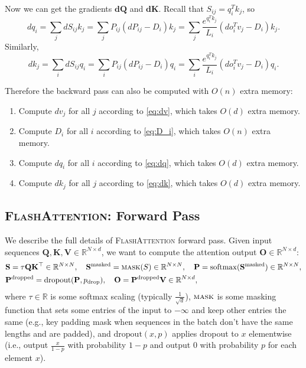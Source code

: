 \documentclass{article}
\newcommand{\softmax}{\mathrm{softmax}}
\newcommand{\vQ}{\mathbf{Q}}
\newcommand{\vK}{\mathbf{K}}
\newcommand{\vV}{\mathbf{V}}
\newcommand{\vdQ}{\mathbf{dQ}}
\newcommand{\vdK}{\mathbf{dK}}
\newcommand{\vS}{\mathbf{S}}
\newcommand{\vP}{\mathbf{P}}
\newcommand{\vO}{\mathbf{O}}
\newcommand{\sysname}{\textsc{FlashAttention}\xspace}
\begin{document}
Now we can get the gradients $\vdQ$ and $\vdK$.
Recall that $S_{ij} = q_i^T k_j$, so
\begin{equation}
  \label{eq:dq}
  dq_i = \sum_{j} dS_{ij} k_j = \sum_{j} P_{ij} (dP_{ij} - D_i) k_j = \sum_{j} \frac{e^{q_i^T k_j}}{L_i} (do_i^T v_j - D_i) k_j.
\end{equation}
Similarly,
\begin{equation}
  \label{eq:dk}
  dk_j = \sum_{i} dS_{ij} q_i = \sum_{i} P_{ij} (dP_{ij} - D_i) q_i = \sum_{i} \frac{e^{q_i^T k_j}}{L_i} (do_i^T v_j - D_i) q_i.
\end{equation}

Therefore the backward pass can also be computed with $O(n)$ extra memory:
\begin{enumerate}
  \item Compute $dv_j$ for all $j$ according to \cref{eq:dv}, which takes
  $O(d)$ extra memory.
  \item Compute $D_i$ for all $i$ according to \cref{eq:D_i}, which takes $O(n)$
  extra memory.
  \item Compute $dq_i$ for all $i$ according to \cref{eq:dq}, which takes
  $O(d)$ extra memory.
  \item Compute $dk_j$ for all $j$ according to \cref{eq:dk}, which takes
  $O(d)$ extra memory.
\end{enumerate}

\subsection{\sysname: Forward Pass}
\label{sec:algo_fwd_full}

We describe the full details of \sysname forward pass.
Given input sequences $\vQ, \vK, \vV \in \mathbb{R}^{N \times d}$, we want to
compute the attention output $\vO \in \mathbb{R}^{N \times d}$:
\begin{align*}
  &\vS = \tau \vQ \vK^\top \in \mathbb{R}^{N \times N}, \quad
  \vS^{\mathrm{masked}} = \textsc{mask}(S) \in \mathbb{R}^{N \times N}, \quad
  \vP = \softmax(\vS^{\mathrm{masked}}) \in \mathbb{R}^{N \times N}, \\
  &\vP^{\mathrm{dropped}} = \mathrm{dropout}(\vP, p_\mathrm{drop}), \quad
  \vO = \vP^{\mathrm{dropped}}\vV \in \mathbb{R}^{N \times d},
\end{align*}
where $\tau \in \mathbb{R}$ is some softmax scaling (typically $\frac{1}{\sqrt{d}}$),
$\textsc{mask}$ is some masking function that sets some entries of the input to
$-\infty$ and keep other entries the same (e.g., key padding mask when sequences
in the batch don't have the same lengths and are padded), and
$\mathrm{dropout}(x, p)$ applies dropout to $x$ elementwise (i.e., output $\frac{x}{1 - p}$
with probability $1 - p$ and output 0 with probability $p$ for each element $x$).
\end{document}
